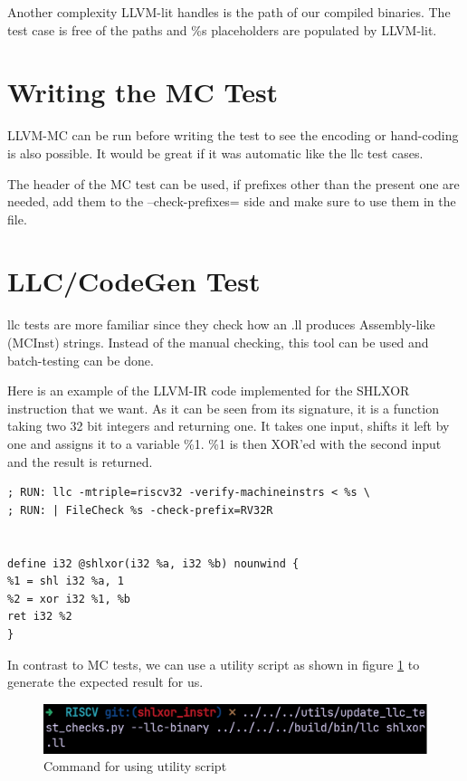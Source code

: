 Another complexity LLVM-lit handles is the path of our compiled binaries. The test case is free of the paths and \%s placeholders are populated by LLVM-lit.

\section{Writing the MC Test}
LLVM-MC can be run before writing the test to see the encoding or hand-coding is also possible. It would be great if it was automatic like the llc test cases.

The header of the MC test can be used, if prefixes other than the present one are needed, add them to the –check-prefixes= side and make sure to use them in the file.

\section{LLC/CodeGen Test}
llc tests are more familiar since they check how an .ll produces Assembly-like (MCInst) strings. Instead of the manual checking, this tool can be used and batch-testing can be done.

Here is an example of the LLVM-IR code implemented for the SHLXOR instruction that we want. As it can be seen from its signature, it is a function taking two 32 bit integers and returning one. It takes one input, shifts it left by one and assigns it to a variable \%1. \%1 is then XOR’ed with the second input and the result is returned.

\begin{lstlisting}
; RUN: llc -mtriple=riscv32 -verify-machineinstrs < %s \ 
; RUN: | FileCheck %s -check-prefix=RV32R 


define i32 @shlxor(i32 %a, i32 %b) nounwind { 
%1 = shl i32 %a, 1 
%2 = xor i32 %1, %b 
ret i32 %2 
} 
\end{lstlisting}

In contrast to MC tests, we can use a utility script as shown in figure \ref{fig:command_for_using_utility_script} to generate the expected result for us.

\begin{figure}
    \centering
    \includegraphics{testing/command_for_using_utility_script.png}
    \caption{Command for using utility script}
    \label{fig:command_for_using_utility_script}
\end{figure}

